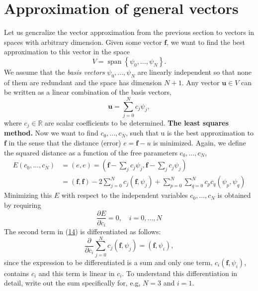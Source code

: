 \documentclass[../main.tex]{subfiles}
\begin{document}
\section[Approximation of general vectors]{Approximation of general vectors}
\label{sec:sec_1_2}
\noindent Let us gencralize the vector approximation from the previous section to vectors in spaces with arbitrary dimension. Given some vector $\boldsymbol{f}$, we want to find the best approximation to this vector in the space
$$
V=\operatorname{span}\left\{\psi_{0}, \ldots, \psi_{N}\right\}.
$$
We assume that the \textit{basis vectors} $\psi_{0}, \ldots, \psi_{N}$ are linearly independent so that none of them are redundant and the space has dimension $N+1$. Any vector $\boldsymbol{u} \in V$ can be written as a linear combination of the basis vectors,
$$
\boldsymbol{u}=\sum_{j=0}^{N} c_{j} \psi_{j},
$$
where $c_{j} \in \mathbb{R}$ are scalar coefficients to be determined.
\bigbreak
\noindent \textbf{The least squares method.} Now we want to find $c_{0}, \ldots, c_{N}$, such that u is the best approximation to $\boldsymbol{f}$ in the sense that the distance (error) $e=\boldsymbol{f}-u$ is minimized. Again, we define the squared distance as a function of the free parameters $c_{0}, \ldots, c_{N}$,
\begin{equation}\label{eqa14}
	\begin{aligned}
	E\left(c_{0}, \ldots, c_{N}\right) &=(e, e)=\left(\boldsymbol{f}-\sum_{j} c_{j} \psi_{j}, \boldsymbol{f}-\sum_{j} c_{j} \psi_{j}\right) \\
	&=(\boldsymbol{f}, \boldsymbol{f})-2 \sum_{j=0}^{N} c_{j}\left(\boldsymbol{f}, \psi_{j}\right)+\sum_{p=0}^{N} \sum_{q=0}^{N} c_{p} c_{q}\left(\psi_{p}, \psi_{q}\right)
	\end{aligned}
\end{equation}
Minimizing this $E$ with respect to the independent variables $c_{0}, \ldots, c_{N}$ is obtained by requiring
$$
\frac{\partial E}{\partial c_{i}}=0, \quad i=0, \ldots, N
$$
The second term in (\hyperref[eqa14]{14}) is differentiated as follows:
\begin{equation}\label{eqa15}
	\frac{\partial}{\partial c_{i}} \sum_{j=0}^{N} c_{j}\left(\boldsymbol{f}, \psi_{j}\right)=\left(\boldsymbol{f}, \psi_{i}\right),
\end{equation}
since the expression to be differentiated is a sum and only one term, $c_{i}\left(\boldsymbol{f}, \psi_{i}\right)$, contains $c_{i}$ and this term is linear in $c_{i}$. To understand this differentiation in detail, write out the sum specifically for, e.g, $N=3$ and $i=1$.
\end{document}
